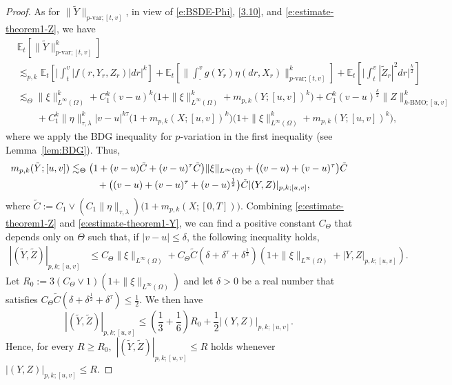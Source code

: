 \documentclass[11pt,reqno]{amsart}
\numberwithin{equation}{section}
\begin{document}
\begin{proof}
As for $\|\tilde{Y}\|_{p\text{-var};[t,v]}$, in view of \eqref{e:BSDE-Phi}, \eqref{3.10}, and \eqref{e:estimate-theorem1-Z}, we have 	
\begin{equation*}
\begin{aligned}
&\mathbb{E}_{t}\left[\|\tilde{Y}\|_{p\text{-var};[t,v]}^{k}\right]\\
&\lesssim_{p,k} \mathbb{E}_{t}\left[\Big|\int_{t}^{v}|f(r,Y_{r},Z_{r})|dr\Big|^{k}\right]+\mathbb{E}_{t}\left[\Big\|\int_{\cdot}^{v}g(Y_{r})\eta(dr,X_{r})\Big\|^{k}_{p\text{-var};[t,v]}\right] + \mathbb{E}_{t}\left[\Big|\int_{t}^{v}|\tilde{Z}_{r}|^{2}dr\Big|^{\frac{k}{2}}\right]\\
&\lesssim_{\Theta}\|\xi\|^k_{L^{\infty}(\Omega)} + C^k_{1}(v-u)^k\big(1+\|\xi\|^k_{L^{\infty}(\Omega)}+m_{p,k}(Y;[u,v])^k\big) + C^k_{1}(v-u)^{\frac{k}{2}}\|Z\|^k_{k\text{-BMO};[u,v]} \\
&\quad\quad + C^k_{1}\|\eta\|^{k}_{\tau,\lambda}|v-u|^{k\tau}\big(1+m_{p,k}(X;[u,v])^k\big)\big(1+\|\xi\|^k_{L^{\infty}(\Omega)}+m_{p,k}(Y;[u,v])^k\big),
\end{aligned}
\end{equation*}
where we apply the  BDG inequality for  $p$-variation in the first inequality (see Lemma~\ref{lem:BDG}).	Thus, 
\begin{equation}\label{e:estimate-theorem1-Y}
\begin{aligned}
m_{p,k}(\tilde{Y};[u,v])
& \lesssim_{\Theta} \big(1 + (v-u)\tilde{C} + (v-u)^{\tau}\tilde{C}\big)\|\xi\|_{L^{\infty}(\Omega)} + \big((v-u) + (v-u)^{\tau}\big)\tilde{C}\\
&\hspace{10mm} + \big((v-u) + (v-u)^{\tau} + (v-u)^{\frac{1}{2}}\big)\tilde{C}|(Y,Z)|_{p,k;[u,v]},
\end{aligned}
\end{equation}
where $\tilde{C} := C_{1}\vee (C_{1}\|\eta\|_{\tau,\lambda})\big(1+m_{p,k}(X;[0,T])\big)$. Combining \eqref{e:estimate-theorem1-Z} and \eqref{e:estimate-theorem1-Y},  we can find a positive constant $C_{\Theta}$ that depends only on $\Theta$ such that, if $|v-u|\le \delta$, the following inequality holds,
\begin{equation}\label{e:prop:ball-invariance-bound of solution}
\begin{aligned}
|(\tilde{Y},\tilde{Z})|_{p,k;[u,v]}&\le C_{\Theta}\|\xi\|_{L^{\infty}(\Omega)} + C_{\Theta}\tilde{C}(\delta + \delta^{\tau} + \delta^{\frac{1}{2}})\left(1 + \|\xi\|_{L^{\infty}(\Omega)}+|Y,Z|_{p,k;[u,v]}\right).
\end{aligned}
\end{equation}
Let $R_{0} := 3(C_{\Theta}\vee 1)(1+\|\xi\|_{L^{\infty}(\Omega)})$ and let $\delta >0$ be a real number that satisfies $C_{\Theta}\tilde{C}\left(\delta+\delta^{\frac{1}{2}}+\delta^{\tau}\right) \le \frac{1}{2}$.  
We then have 
\begin{equation}\label{e:bd-(Y,Z)}
|(\tilde{Y},\tilde{Z})|_{p,k;[u,v]}\le \left(\frac{1}{3}+\frac{1}{6}\right)R_0 + \frac{1}{2} |(Y,Z)|_{p,k;[u,v]}.
\end{equation}
Hence, for every $R\ge R_{0},$ $|(\tilde{Y},\tilde{Z})|_{p,k;[u,v]}\le R$ holds whenever $|(Y,Z)|_{p,k;[u,v]}\le R$.


\end{proof}
\end{document}
